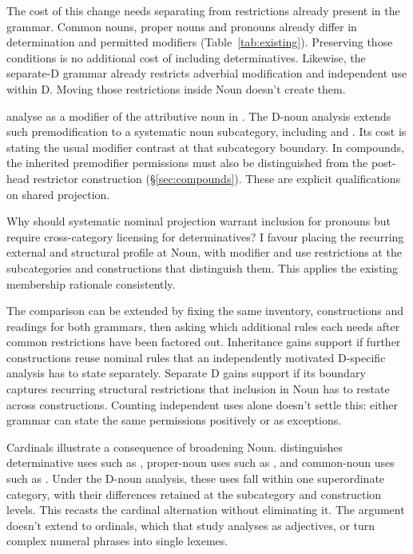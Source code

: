 \documentclass[12pt]{article}
\begin{document}
The cost of this change needs separating from restrictions already present in the grammar. Common nouns, proper nouns and pronouns already differ in determination and permitted modifiers (Table~\ref{tab:existing}). Preserving those conditions is no additional cost of including determinatives. Likewise, the separate-D grammar already restricts adverbial modification and independent use within D. Moving those restrictions inside Noun doesn't create them.

\textcite[p.~75, n.~3]{payne2010} analyse  as a modifier of the attributive noun  in . The D-noun analysis extends such premodification to a systematic noun subcategory, including  and . Its cost is stating the usual modifier contrast at that subcategory boundary. In compounds, the inherited premodifier permissions must also be distinguished from the post-head restrictor construction (§\ref{sec:compounds}). These are explicit qualifications on shared projection.

Why should systematic nominal projection warrant inclusion for pronouns but require cross-category licensing for determinatives? I favour placing the recurring external and structural profile at Noun, with modifier and use restrictions at the subcategories and constructions that distinguish them. This applies the existing membership rationale consistently.

The comparison can be extended by fixing the same inventory, constructions and readings for both grammars, then asking which additional rules each needs after common restrictions have been factored out. Inheritance gains support if further constructions reuse nominal rules that an independently motivated D-specific analysis has to state separately. Separate D gains support if its boundary captures recurring structural restrictions that inclusion in Noun has to restate across constructions. Counting independent uses alone doesn't settle this: either grammar can state the same permissions positively or as exceptions.

Cardinals illustrate a consequence of broadening Noun. \textcite{reynolds2026numerals} distinguishes determinative uses such as , proper-noun uses such as , and common-noun uses such as . Under the D-noun analysis, these uses fall within one superordinate category, with their differences retained at the subcategory and construction levels. This recasts the cardinal alternation without eliminating it. The argument doesn't extend to ordinals, which that study analyses as adjectives, or turn complex numeral phrases into single lexemes.
\end{document}
